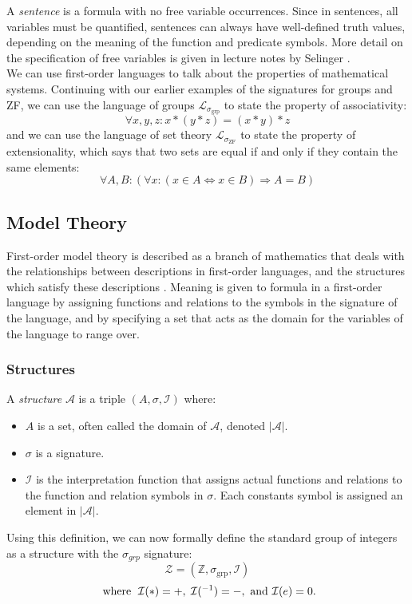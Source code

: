 \documentclass[11pt]{article}
\theoremstyle{definition}
\theoremstyle{theorem}
\theoremstyle{lemma}
\begin{document}
A \emph{sentence} is a formula with no free variable occurrences.
Since in sentences, all variables must be quantified, sentences can always have well-defined truth values, depending on the meaning of the function and predicate symbols.
More detail on the specification of free variables is given in lecture notes by Selinger \cite[ch.~1.9]{selinger}.\\

\noindent
We can use first-order languages to talk about the properties of mathematical systems.
Continuing with our earlier examples of the signatures for groups and ZF, we can use the language of groups $\mathcal{L}_{\sigma_{\text{grp}}}$ to state the property of associativity:
$$\forall x,y,z: x*(y*z) = (x*y)*z$$
and we can use the language of set theory $\mathcal{L}_{\sigma_{\text{ZF}}}$ to state the property of extensionality, which says that two sets are equal if and only if they contain the same elements:
$$\forall A,B: (\forall x:(x\in A \Leftrightarrow x\in B) \Rightarrow A = B)$$

\subsection{Model Theory}
First-order model theory is described as a branch of mathematics that deals with the relationships between descriptions in first-order languages, and the structures which satisfy these descriptions \cite{stanmodel}.
Meaning is given to formula in a first-order language by assigning functions and relations to the symbols in the signature of the language, and by specifying a set that acts as the domain for the variables of the language to range over.

\subsubsection{Structures}
A \emph{structure} \cite[ch.~2.1]{selinger} $\mathcal{A}$ is a triple $(A, \sigma,\mathcal{I})$ where:
\begin{itemize}
  \item $A$ is a set, often called the domain of $\mathcal{A}$, denoted $|\mathcal{A}|$.
  \item $\sigma$ is a signature.
  \item $\mathcal I$ is the interpretation function that assigns actual functions and relations to the function and relation symbols in $\sigma$. Each constants symbol is  assigned an element in $|\mathcal{A}|$.
\end{itemize}
Using this definition, we can now formally define the standard group of integers as a structure with the $\sigma_{\mathit{grp}}$ signature:
$$\mathcal{Z} = (\mathbb{Z}, \sigma_{\text{grp}}, \mathcal{I})$$
$$\text{ where \hspace{1mm}} \mathcal{I}(*) = +,\hspace{1mm} \mathcal{I}(^{-1}) = -, \text{ and } \mathcal{I}(e) = 0.$$
\end{document}
